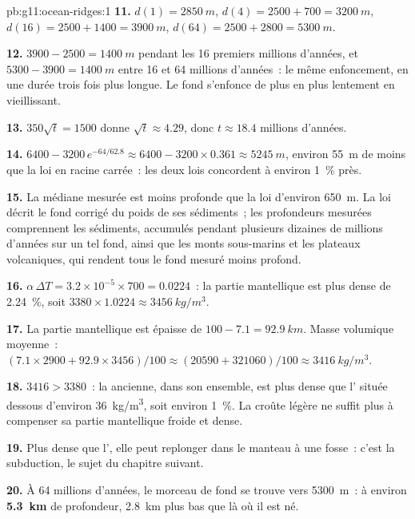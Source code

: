 \begin{solution}{pb:g11:ocean-ridges:1}
\textbf{11.} $d(1) = \qty{2850}{m}$, $d(4) = 2500 + 700 = \qty{3200}{m}$,
$d(16) = 2500 + 1400 = \qty{3900}{m}$, $d(64) = 2500 + 2800 = \qty{5300}{m}$.

\textbf{12.} $3900 - 2500 = \qty{1400}{m}$ pendant les 16 premiers millions
d'années, et $5300 - 3900 = \qty{1400}{m}$ entre 16 et 64 millions
d'années~: le même enfoncement, en une durée trois fois plus longue. Le fond
s'enfonce de plus en plus lentement en vieillissant.

\textbf{13.} $350\sqrt{t} = 1500$ donne $\sqrt{t} \approx 4.29$, donc
$t \approx 18.4$ millions d'années.

\textbf{14.} $6400 - 3200\,e^{-64/62.8} \approx 6400 - 3200 \times 0.361
\approx \qty{5245}{m}$, environ \qty{55}{m} de moins que la loi en racine
carrée~: les deux lois concordent à environ \qty{1}{\percent} près.

\textbf{15.} La médiane mesurée est moins profonde que la loi d'environ
\qty{650}{m}. La loi décrit le fond corrigé du poids de ses sédiments~; les
profondeurs mesurées comprennent les sédiments, accumulés pendant plusieurs
dizaines de millions d'années sur un tel fond, ainsi que les monts
sous-marins et les plateaux volcaniques, qui rendent tous le fond mesuré
moins profond.

\textbf{16.} $\alpha\,\Delta T = 3.2 \times 10^{-5} \times 700 = 0.0224$~: la
partie mantellique est plus dense de \qty{2.24}{\percent}, soit
$3380 \times 1.0224 \approx \qty{3456}{kg/m^3}$.

\textbf{17.} La partie mantellique est épaisse de $100 - 7.1 = \qty{92.9}{km}$.
Masse volumique moyenne~: $(7.1 \times 2900 + 92.9 \times 3456)/100 \approx (20590 + 321060)/100
\approx \qty{3416}{kg/m^3}$.

\textbf{18.} $3416 > 3380$~: la  ancienne, dans son ensemble, est
plus dense que l' située dessous d'environ \qty{36}{kg/m^3},
soit environ \qty{1}{\percent}. La croûte légère ne suffit plus à compenser
sa partie mantellique froide et dense.

\textbf{19.} Plus dense que l', elle peut replonger dans le
manteau à une fosse~: c'est la subduction, le sujet du chapitre suivant.

\textbf{20.} À 64 millions d'années, le morceau de fond se trouve vers
\qty{5300}{m}~: à environ \textbf{5.3~km} de profondeur, \qty{2.8}{km} plus
bas que là où il est né.
\end{solution}
